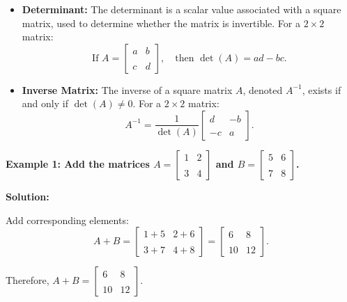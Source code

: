 \begin{itemize}
\begin{itemize}
    \end{itemize}
    \item \textbf{Determinant:} The determinant is a scalar value associated with a square matrix, used to determine whether the matrix is invertible. For a $2 \times 2$ matrix:
    \[
    \text{If } A = \begin{bmatrix} a & b \\\\ c & d \end{bmatrix}, \quad \text{then } \det(A) = ad - bc.
    \]
    \item \textbf{Inverse Matrix:} The inverse of a square matrix $A$, denoted $A^{-1}$, exists if and only if $\det(A) \neq 0$. For a $2 \times 2$ matrix:
    \[
    A^{-1} = \frac{1}{\det(A)} \begin{bmatrix} d & -b \\\\ -c & a \end{bmatrix}.
    \]
\end{itemize}

\begin{flushleft}
\textbf{Example 1: Add the matrices $A = \begin{bmatrix} 1 & 2 \\\\ 3 & 4 \end{bmatrix}$ and $B = \begin{bmatrix} 5 & 6 \\\\ 7 & 8 \end{bmatrix}$.}

\vspace{0.5cm}
\textbf{Solution:}
\vspace{0.5cm}

Add corresponding elements:
\[
A + B = \begin{bmatrix} 1+5 & 2+6 \\\\ 3+7 & 4+8 \end{bmatrix} = \begin{bmatrix} 6 & 8 \\\\ 10 & 12 \end{bmatrix}.
\]

Therefore, $A + B = \begin{bmatrix} 6 & 8 \\\\ 10 & 12 \end{bmatrix}$.
\end{flushleft}

